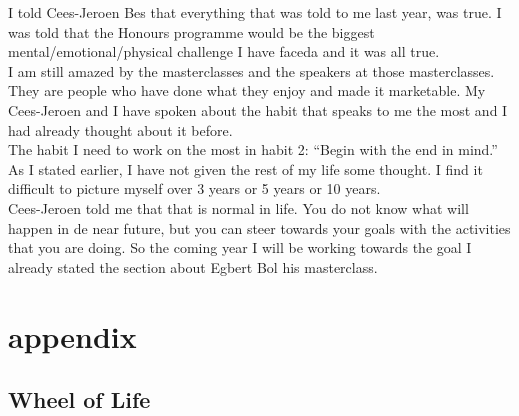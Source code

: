 \documentclass{article}
\begin{document}
I told Cees-Jeroen Bes that everything that was told to me last year, was true. I was told that the Honours programme would be the biggest mental/emotional/physical challenge I have faceda and it was all true.\\

I am still amazed by the masterclasses and the speakers at those masterclasses. They are people who have done what they enjoy and made it marketable. My Cees-Jeroen and I have spoken about the habit that speaks to me the most and I had already thought about it before.\\

The habit I need to work on the most in habit 2: ``Begin with the end in mind.'' As I stated earlier, I have not given the rest of my life some thought. I find it difficult to picture myself over 3 years or 5 years or 10 years. \\

Cees-Jeroen told me that that is normal in life. You do not know what will happen in de near future, but you can steer towards your goals with the activities that you are doing. So the coming year I will be working towards the goal I already stated the section about Egbert Bol his masterclass.\\

  




\newpage
\section{appendix}
\appendix
\subsection{Wheel of Life}\label{app:wol}

\end{document}
